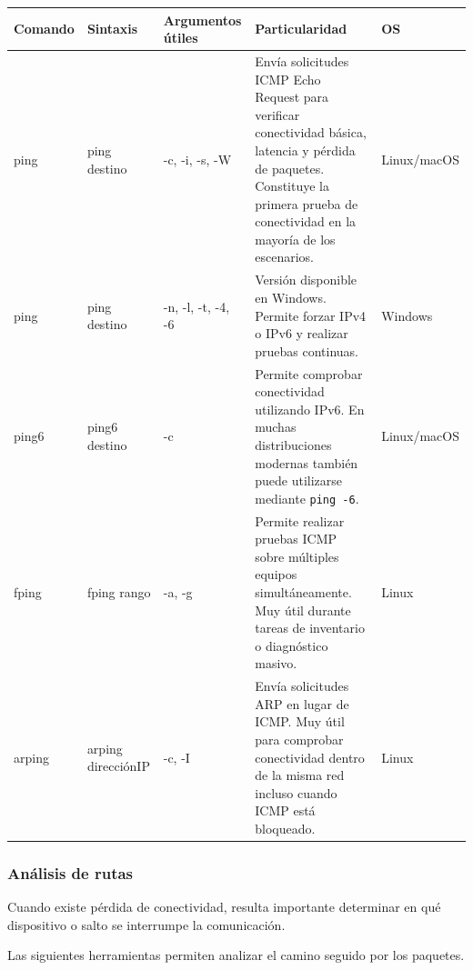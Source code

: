 \documentclass[a4paper,10pt]{article}
\begin{document}
\begin{longtable}{|p{2.8cm}|p{3cm}|p{4cm}|p{5.6cm}|p{1.5cm}|}

\hline
Comando &
Sintaxis &
Argumentos útiles &
Particularidad &
OS
\\
\hline
\endhead

ping &
ping destino &
-c, -i, -s, -W &
Envía solicitudes ICMP Echo Request para verificar conectividad básica, latencia y pérdida de paquetes. Constituye la primera prueba de conectividad en la mayoría de los escenarios. &
Linux/macOS
\\
\hline

ping &
ping destino &
-n, -l, -t, -4, -6 &
Versión disponible en Windows. Permite forzar IPv4 o IPv6 y realizar pruebas continuas. &
Windows
\\
\hline

ping6 &
ping6 destino &
-c &
Permite comprobar conectividad utilizando IPv6. En muchas distribuciones modernas también puede utilizarse mediante \texttt{ping -6}. &
Linux/macOS
\\
\hline

fping &
fping rango &
-a, -g &
Permite realizar pruebas ICMP sobre múltiples equipos simultáneamente. Muy útil durante tareas de inventario o diagnóstico masivo. &
Linux
\\
\hline

arping &
arping direcciónIP &
-c, -I &
Envía solicitudes ARP en lugar de ICMP. Muy útil para comprobar conectividad dentro de la misma red incluso cuando ICMP está bloqueado. &
Linux
\\
\hline


\end{longtable}


\subsubsection{Análisis de rutas}

Cuando existe pérdida de conectividad, resulta importante determinar en qué
dispositivo o salto se interrumpe la comunicación.

Las siguientes herramientas permiten analizar el camino seguido por los paquetes.
\end{document}
